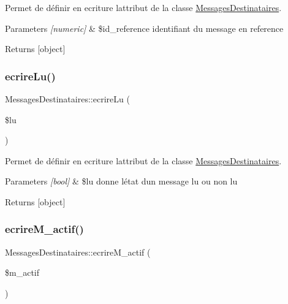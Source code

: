 Permet de définir en ecriture l\textquotesingle{}attribut de la classe \hyperlink{class_messages_destinataires}{Messages\+Destinataires}. 


\begin{DoxyParams}{Parameters}
{\em \mbox{[}numeric\mbox{]}} & \$id\+\_\+reference identifiant du message en reference \\
\hline
\end{DoxyParams}
\begin{DoxyReturn}{Returns}
\mbox{[}object\mbox{]} 
\end{DoxyReturn}
\mbox{\label{class_messages_destinataires_ad10c883539e985ff80bcb9e7a675edb4}} 
\subsubsection{\texorpdfstring{ecrire\+Lu()}{ecrireLu()}}
{\footnotesize\ttfamily Messages\+Destinataires\+::ecrire\+Lu (\begin{DoxyParamCaption}\item[{}]{\$lu }\end{DoxyParamCaption})}



Permet de définir en ecriture l\textquotesingle{}attribut de la classe \hyperlink{class_messages_destinataires}{Messages\+Destinataires}. 


\begin{DoxyParams}{Parameters}
{\em \mbox{[}bool\mbox{]}} & \$lu donne l\textquotesingle{}état d\textquotesingle{}un message lu ou non lu \\
\hline
\end{DoxyParams}
\begin{DoxyReturn}{Returns}
\mbox{[}object\mbox{]} 
\end{DoxyReturn}
\mbox{\label{class_messages_destinataires_a677ba8293e169ff636bfb9bf5c454abc}} 
\subsubsection{\texorpdfstring{ecrire\+M\+\_\+actif()}{ecrireM\_actif()}}
{\footnotesize\ttfamily Messages\+Destinataires\+::ecrire\+M\+\_\+actif (\begin{DoxyParamCaption}\item[{}]{\$m\+\_\+actif }\end{DoxyParamCaption})}



